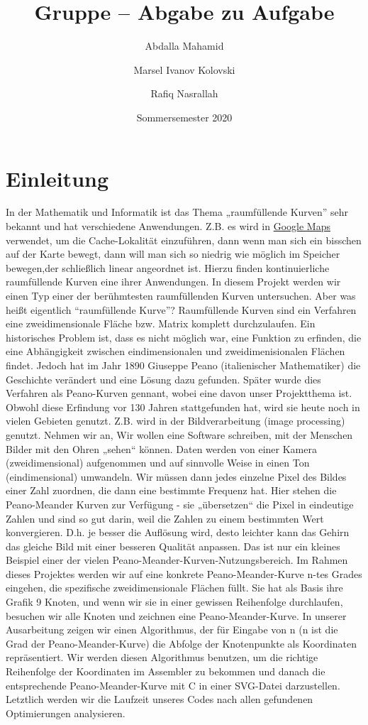 \documentclass[course=erap]{aspdoc}
\author{Abdalla Mahamid \and Marsel Ivanov Kolovski \and Rafiq Nasrallah}
\date{Sommersemester 2020 } %
\title{Gruppe \theGroup{199} -- Abgabe zu Aufgabe \theNumber}
\begin{document}
\maketitle

\section{Einleitung}
\hspace{0.3cm}
In der Mathematik und Informatik ist das Thema „raumfüllende Kurven” sehr bekannt und hat verschiedene Anwendungen. Z.B. es wird in \href{https://mathoverflow.net/questions/237132/applications-of-space-filling-curves}{Google Maps} verwendet, um die Cache-Lokalität einzuführen, dann wenn man sich ein bisschen auf der Karte bewegt, dann will man sich so niedrig wie möglich im Speicher bewegen,der schließlich linear angeordnet ist. Hierzu finden kontinuierliche raumfüllende Kurven eine ihrer Anwendungen.  In diesem Projekt werden wir einen Typ einer der berühmtesten raumfüllenden Kurven untersuchen. Aber was heißt eigentlich “raumfüllende Kurve”?
Raumfüllende Kurven sind ein Verfahren eine zweidimensionale Fläche bzw. Matrix komplett durchzulaufen. Ein historisches Problem ist, dass es nicht möglich war, eine Funktion zu erfinden, die eine Abhängigkeit zwischen eindimensionalen und zweidimenisionalen Flächen findet. Jedoch hat im Jahr 1890 Giuseppe Peano (italienischer Mathematiker)\cite{BaderBook} die Geschichte verändert und eine Lösung dazu gefunden. Später wurde dies Verfahren als Peano-Kurven gennant, wobei eine davon unser Projektthema ist. Obwohl diese Erfindung vor 130 Jahren stattgefunden hat, wird sie heute noch in vielen Gebieten genutzt. Z.B. wird in der Bildverarbeitung (image processing) genutzt. Nehmen wir an, Wir wollen eine Software schreiben, mit der Menschen Bilder mit den Ohren „sehen“ können. Daten werden von einer Kamera (zweidimensional) aufgenommen und auf sinnvolle Weise in einen Ton (eindimensional) umwandeln. Wir müssen dann jedes einzelne Pixel des Bildes einer Zahl zuordnen, die dann eine bestimmte Frequenz hat. Hier stehen die Peano-Meander Kurven zur Verfügung - sie „übersetzen“ die Pixel in eindeutige Zahlen und sind so gut darin, weil die Zahlen zu einem bestimmten Wert konvergieren. D.h. je besser die Auflösung wird, desto leichter kann das Gehirn das gleiche Bild mit einer besseren Qualität anpassen.\cite{scientificamerican}
Das ist nur ein kleines Beispiel einer der vielen Peano-Meander-Kurven-Nutzungsbereich. Im Rahmen dieses Projektes werden wir auf eine konkrete Peano-Meander-Kurve n-tes Grades eingehen, die spezifische zweidimensionale Flächen füllt. Sie hat als Basis ihre Grafik 9 Knoten, und wenn wir sie in einer gewissen Reihenfolge durchlaufen, besuchen wir alle Knoten und zeichnen eine Peano-Meander-Kurve.
In unserer Ausarbeitung zeigen wir einen Algorithmus, der für Eingabe von n (n ist die Grad der Peano-Meander-Kurve) die Abfolge der Knotenpunkte als Koordinaten repräsentiert. Wir werden diesen Algorithmus benutzen, um die richtige Reihenfolge der Koordinaten im Assembler zu bekommen und danach die entsprechende Peano-Meander-Kurve mit C in einer SVG-Datei darzustellen. Letztlich werden wir die Laufzeit unseres Codes nach allen gefundenen Optimierungen analysieren.   
\end{document}
